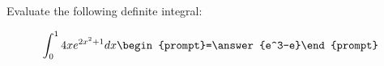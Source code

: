 \documentclass{ximera}
\author{Jim Talamo}
\begin{document}
\begin{exercise}
Evaluate the following definite integral:

\[
\int_0^1 4xe^{2x^2+1} dx 
\begin{prompt}=\answer{e^3-e}\end{prompt}
\]
\end{exercise}
\end{document}
